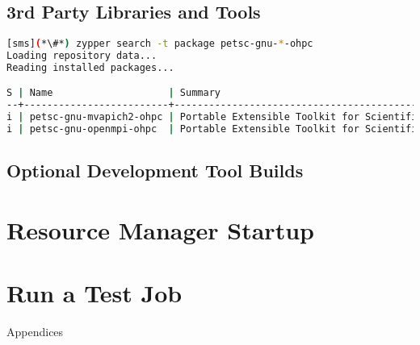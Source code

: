 \documentclass[letterpaper]{article}
\begin{document}
\subsection{3rd Party Libraries and Tools} \label{sec:3rdparty}



\begin{lstlisting}[language=bash,keepspaces=true,keywords={}]
[sms](*\#*) zypper search -t package petsc-gnu-*-ohpc
Loading repository data...
Reading installed packages...

S | Name                    | Summary
--+-------------------------+--------------------------------------------------------+--------
i | petsc-gnu-mvapich2-ohpc | Portable Extensible Toolkit for Scientific Computation | package
i | petsc-gnu-openmpi-ohpc  | Portable Extensible Toolkit for Scientific Computation | package
\end{lstlisting}




\subsection{Optional Development Tool Builds} \label{sec:3rdparty_intel}


\section{Resource Manager Startup} \label{sec:rms_startup}


\section{Run a Test Job} \label{sec:test_job}


\clearpage
\appendix
{\bf \LARGE \centerline{Appendices}} \vspace*{0.2cm}

\renewcommand{\thesubsection}{\Alph{subsection}}





\end{document}
